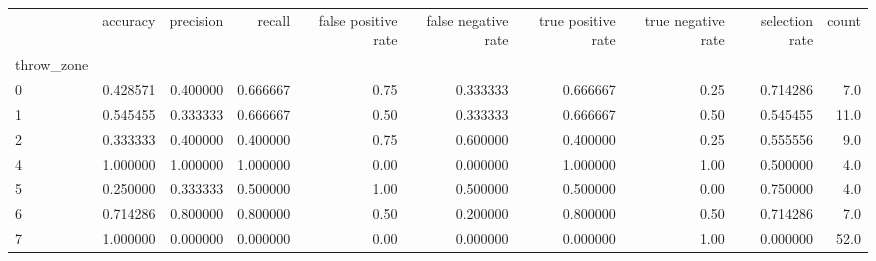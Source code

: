 \begin{tabular}{lrrrrrrrrr}
\toprule
{} &  accuracy &  precision &    recall &  false positive rate &  false negative rate &  true positive rate &  true negative rate &  selection rate &  count \\
throw\_zone &           &            &           &                      &                      &                     &                     &                 &        \\
\midrule
0          &  0.428571 &   0.400000 &  0.666667 &                 0.75 &             0.333333 &            0.666667 &                0.25 &        0.714286 &    7.0 \\
1          &  0.545455 &   0.333333 &  0.666667 &                 0.50 &             0.333333 &            0.666667 &                0.50 &        0.545455 &   11.0 \\
2          &  0.333333 &   0.400000 &  0.400000 &                 0.75 &             0.600000 &            0.400000 &                0.25 &        0.555556 &    9.0 \\
4          &  1.000000 &   1.000000 &  1.000000 &                 0.00 &             0.000000 &            1.000000 &                1.00 &        0.500000 &    4.0 \\
5          &  0.250000 &   0.333333 &  0.500000 &                 1.00 &             0.500000 &            0.500000 &                0.00 &        0.750000 &    4.0 \\
6          &  0.714286 &   0.800000 &  0.800000 &                 0.50 &             0.200000 &            0.800000 &                0.50 &        0.714286 &    7.0 \\
7          &  1.000000 &   0.000000 &  0.000000 &                 0.00 &             0.000000 &            0.000000 &                1.00 &        0.000000 &   52.0 \\
\bottomrule
\end{tabular}
